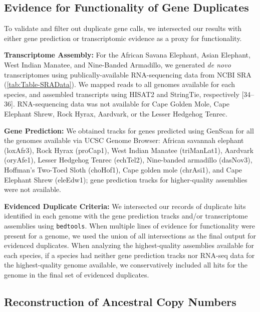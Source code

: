 \documentclass[]{elsarticle} %
\begin{document}
\hypertarget{evidence-for-functionality-of-gene-duplicates}{%
\subsection{Evidence for Functionality of Gene Duplicates}\label{evidence-for-functionality-of-gene-duplicates}}

To validate and filter out duplicate gene calls, we intersected our results with either gene prediction or transcriptomic evidence as a proxy for functionality.

\textbf{Transcriptome Assembly:} For the African Savana Elephant, Asian Elephant, West Indian Manatee, and Nine-Banded Armadillo, we generated \emph{de novo} transcriptomes using publically-available RNA-sequencing data from NCBI SRA (\ref{tab:Table-SRAData}). We mapped reads to all genomes available for each species, and assembled transcripts using HISAT2 and StringTie, respectively {[}34--36{]}. RNA-sequencing data was not available for Cape Golden Mole, Cape Elephant Shrew, Rock Hyrax, Aardvark, or the Lesser Hedgehog Tenrec.

\textbf{Gene Prediction:} We obtained tracks for genes predicted using GenScan for all the genomes available via UCSC Genome Browser: African savannah elephant (loxAfr3), Rock Hyrax (proCap1), West Indian Manatee (triManLat1), Aardvark (oryAfe1), Lesser Hedgehog Tenrec (echTel2), Nine-banded armadillo (dasNov3), Hoffman's Two-Toed Sloth (choHof1), Cape golden mole (chrAsi1), and Cape Elephant Shrew (eleEdw1); gene prediction tracks for higher-quality assemblies were not available.

\textbf{Evidenced Duplicate Criteria:} We intersected our records of duplicate hits identified in each genome with the gene prediction tracks and/or transcriptome assemblies using \texttt{bedtools}. When multiple lines of evidence for functionality were present for a genome, we used the union of all intersections as the final output for evidenced duplicates. When analyzing the highest-quality assemblies available for each species, if a species had neither gene prediction tracks nor RNA-seq data for the highest-quality genome available, we conservatively included all hits for the genome in the final set of evidenced duplicates.

\hypertarget{reconstruction-of-ancestral-copy-numbers}{%
\subsection{Reconstruction of Ancestral Copy Numbers}\label{reconstruction-of-ancestral-copy-numbers}}
\end{document}
